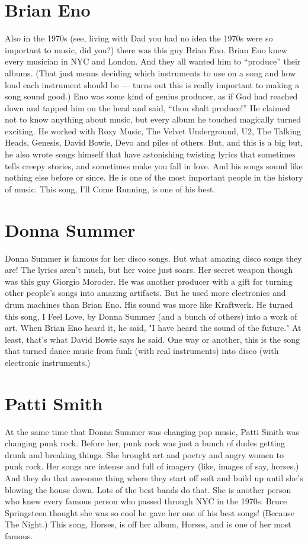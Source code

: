\documentclass[letterpaper,12pt,single]{article}
\begin{document}
\section{Brian Eno}

Also in the 1970s (see, living with Dad you had no idea the 1970s were so important to music, did you?) there was this guy Brian Eno. 
Brian Eno knew every musician in NYC and London. 
And they all wanted him to ``produce'' their albums. 
(That just means deciding which instruments to use on a song and how loud each instrument should be --- turns out this is really important to making a song sound good.) 
Eno was some kind of genius producer, as if God had reached down and tapped him on the head and said, ``thou shalt produce!''
He claimed not to know anything about music, but every album he touched magically turned exciting. 
He worked with Roxy Music, The Velvet Underground, U2, The Talking Heads, Genesis, David Bowie, Devo and piles of others. 
But, and this is a big but, he also wrote songs himself that have astonishing twisting lyrics that sometimes tells creepy stories, and sometimes make you fall in love. 
And his songs sound like nothing else before or since. 
He is one of the most important people in the history of music. This song, I'll Come Running, is one of his best.

\section{Donna Summer}

Donna Summer is famous for her disco songs. But what amazing disco songs they are! The lyrics aren't much, but her voice just soars. Her secret weapon though was this guy Giorgio Moroder. He was another producer with a gift for turning other people's songs into amazing artifacts. But he used more electronics and drum machines than Brian Eno. His sound was more like Kraftwerk. He turned this song, I Feel Love, by Donna Summer (and a bunch of others) into a work of art. When Brian Eno heard it, he said, "I have heard the sound of the future." At least, that's what David Bowie says he said. One way or another, this is the song that turned dance music from funk (with real instruments) into disco (with electronic instruments.)

\section{Patti Smith}

At the same time that Donna Summer was changing pop music, Patti Smith was changing punk rock. Before her, punk rock was just a bunch of dudes getting drunk and breaking things. She brought art and poetry and angry women to punk rock. Her songs are intense and full of imagery (like, images of say, horses.) And they do that awesome thing where they start off soft and build up until she's blowing the house down. Lots of the best bands do that. She is another person who knew every famous person who passed through NYC in the 1970s. Bruce Springsteen thought she was so cool he gave her one of his best songs! (Because The Night.) This song, Horses, is off her album, Horses, and is one of her most famous.
\end{document}
